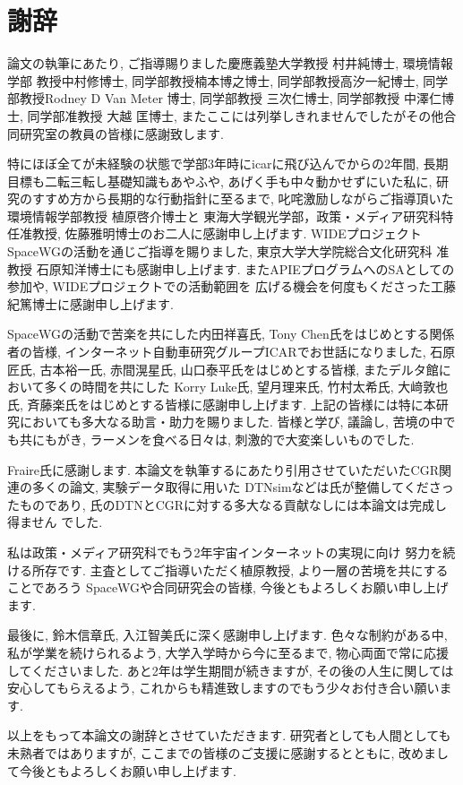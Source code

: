 \chapter*{謝辞}
論文の執筆にあたり, ご指導賜りました慶應義塾大学教授 村井純博士, 環境情報学部
教授中村修博士, 同学部教授楠本博之博士, 同学部教授高汐一紀博士, 同学部教授Rodney
D Van Meter 博士, 同学部教授 三次仁博士, 同学部教授 中澤仁博士, 同学部准教授 大越
匡博士, またここには列挙しきれませんでしたがその他合同研究室の教員の皆様に感謝致します. 

特にほぼ全てが未経験の状態で学部3年時にicarに飛び込んでからの2年間, 
長期目標も二転三転し基礎知識もあやふや, あげく手も中々動かせずにいた私に, 
研究のすすめ方から長期的な行動指針に至るまで, 叱咤激励しながらご指導頂いた
環境情報学部教授 植原啓介博士と
東海大学観光学部，政策・メディア研究科特任准教授, 佐藤雅明博士のお二人に感謝申し上げます. 
WIDEプロジェクトSpaceWGの活動を通じご指導を賜りました, 
東京大学大学院総合文化研究科 准教授 石原知洋博士にも感謝申し上げます. 
またAPIEプログラムへのSAとしての参加や, WIDEプロジェクトでの活動範囲を
広げる機会を何度もくださった工藤紀篤博士に感謝申し上げます. 

SpaceWGの活動で苦楽を共にした内田祥喜氏, Tony Chen氏をはじめとする関係者の皆様, 
インターネット自動車研究グループICARでお世話になりました, 
石原匠氏, 古本裕一氏, 赤間滉星氏, 山口泰平氏をはじめとする皆様, 
またデルタ館において多くの時間を共にした
Korry Luke氏, 望月理来氏, 竹村太希氏, 大﨑敦也氏, 斉藤楽氏をはじめとする皆様に感謝申し上げます. 
上記の皆様には特に本研究においても多大なる助言・助力を賜りました. 
皆様と学び, 議論し, 苦境の中でも共にもがき, ラーメンを食べる日々は, 刺激的で大変楽しいものでした. 

Fraire氏に感謝します. 本論文を執筆するにあたり引用させていただいたCGR関連の多くの論文, 実験データ取得に用いた
DTNsimなどは氏が整備してくださったものであり, 氏のDTNとCGRに対する多大なる貢献なしには本論文は完成し得ません
でした. 

私は政策・メディア研究科でもう2年宇宙インターネットの実現に向け
努力を続ける所存です. 主査としてご指導いただく植原教授, より一層の苦境を共にすることであろう
SpaceWGや合同研究会の皆様, 今後ともよろしくお願い申し上げます. 

最後に, 鈴木信章氏, 入江智美氏に深く感謝申し上げます. 色々な制約がある中, 
私が学業を続けられるよう, 大学入学時から今に至るまで, 物心両面で常に応援してくださいました. あと2年は学生期間が続きますが, 
その後の人生に関しては安心してもらえるよう, これからも精進致しますのでもう少々お付き合い願います. 

以上をもって本論文の謝辞とさせていただきます. 研究者としても人間としても未熟者ではありますが, 
ここまでの皆様のご支援に感謝するとともに, 改めまして今後ともよろしくお願い申し上げます. 


